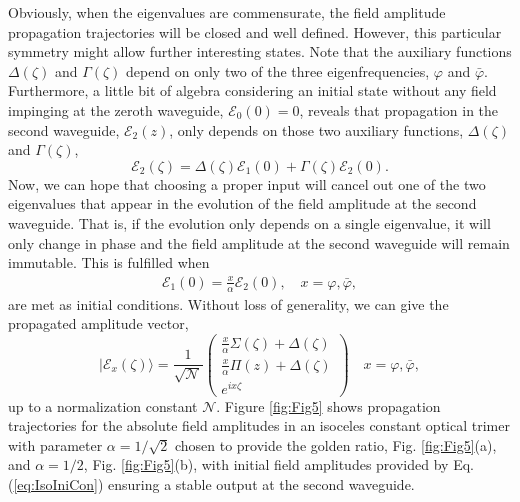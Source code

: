 \documentclass[9pt,twocolumn,twoside]{osajnl}
\begin{document}
Obviously, when the eigenvalues are commensurate, the field amplitude propagation trajectories will be closed and well defined. 
However, this particular symmetry might allow further interesting states.
Note that the auxiliary functions $\Delta(\zeta)$ and $\Gamma(\zeta)$ depend on only two of the three eigenfrequencies, $\varphi$ and $\bar{\varphi}$. 
Furthermore, a little bit of algebra considering an initial state without any field impinging at the zeroth waveguide, $\mathcal{E}_{0}(0)=0$, reveals that propagation in the second waveguide, $\mathcal{E}_{2}(z)$, only depends on those two auxiliary functions, $\Delta(\zeta)$ and $\Gamma(\zeta)$,
\begin{equation}
\mathcal{E}_{2}(\zeta) = \Delta(\zeta)\mathcal{E}_{1}(0)
+\Gamma(\zeta)\mathcal{E}_{2}(0).
\end{equation}
Now, we can hope that choosing a proper input will cancel out one of the two 
eigenvalues that appear in the evolution of the field amplitude at the second waveguide.
That is, if the evolution only depends on a single eigenvalue, it will only change in phase and the field amplitude at the second waveguide will remain immutable. 
This is fulfilled when
\begin{eqnarray}
\mathcal{E}_{1}(0)= \frac{x}{\alpha} \mathcal{E}_{2}(0), \quad x= \varphi, \bar{\varphi}, \label{eq:IsoIniCon}
\end{eqnarray}
are met as initial conditions.
Without loss of generality, we can give the propagated amplitude vector,
\begin{equation} \label{eq:StatAmp}
\vert \mathcal{E}_{x}(\zeta) \rangle = \frac{1}{\sqrt{\mathcal{N}}}\left( \begin{array}{c}
\frac{x}{\alpha} \Sigma(\zeta) + \Delta(\zeta) \\
\frac{x}{\alpha} \Pi(z) + \Delta(\zeta) \\
e^{i x \zeta }
\end{array} \right)	\quad x= \varphi, \bar{\varphi},
\end{equation}
up to a normalization constant $\mathcal{N}$.
Figure \ref{fig:Fig5} shows propagation trajectories for the absolute field amplitudes in an isoceles constant optical trimer with parameter $\alpha = 1 /\sqrt{2}$ chosen to provide the golden ratio, Fig. \ref{fig:Fig5}(a), and  $\alpha = 1/ 2$, Fig. \ref{fig:Fig5}(b), with initial field amplitudes provided by Eq.(\ref{eq:IsoIniCon}) ensuring a stable output at the second waveguide.
\end{document}
